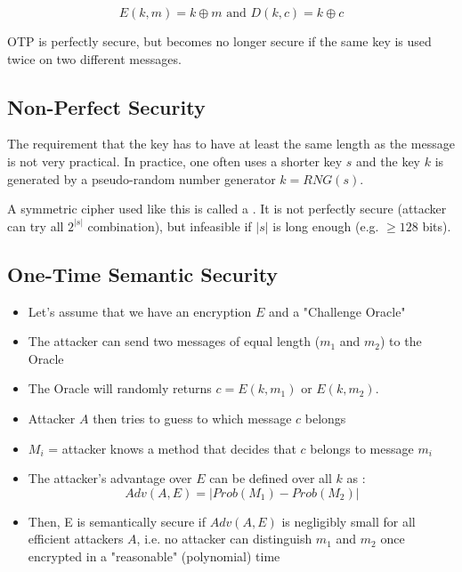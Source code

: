 \begin{equation*}
E(k, m) = k \oplus m \text{ and } D(k, c) = k \oplus c
\end{equation*}

OTP is perfectly secure, but becomes no longer secure if the same key is used twice on two different messages.

\subsection{Non-Perfect Security}

The requirement that the key has to have at least the same length as the message is not very practical. In practice, one often uses a shorter key $s$ and the key $k$ is generated by a pseudo-random number generator $k = RNG(s)$.

A symmetric cipher used like this is called a . It is not perfectly secure (attacker can try all $2^{|s|}$ combination), but infeasible if $|s|$ is long enough (e.g. $\geq 128$ bits).

\subsection{One-Time Semantic Security}

\begin{itemize}
    \item Let's assume that we have an encryption $E$ and a "Challenge Oracle"
    \item The attacker can send two messages of equal length ($m_1$ and $m_2$) to the Oracle
    \item The Oracle will randomly returns $c = E(k, m_1)$ or $E(k, m_2)$.
    \item Attacker $A$ then tries to guess to which message $c$ belongs
    \item $M_i$ = attacker knows a method that decides that $c$ belongs to message $m_i$
    \item The attacker's advantage over $E$ can be defined over all $k$ as :
    \begin{equation*}
        Adv(A, E) = |Prob(M_1) - Prob(M_2)|
    \end{equation*}
    \item Then, E is semantically secure if $Adv(A, E)$ is negligibly small for all efficient attackers $A$, i.e. no attacker can distinguish $m_1$ and $m_2$ once encrypted in a "reasonable" (polynomial) time
\end{itemize}

